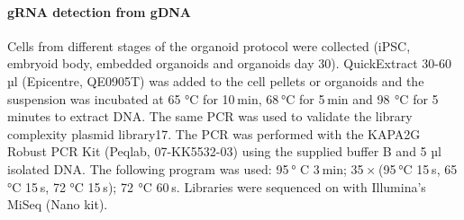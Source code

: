 \paragraph{gRNA detection from gDNA}
Cells from different stages of the organoid protocol were collected (iPSC, embryoid body, embedded organoids and organoids day 30). QuickExtract 30-60 µl (Epicentre, QE0905T) was added to the cell pellets or organoids and the suspension was incubated at 65 °C for 10 min, 68 °C for 5 min and 98  °C for 5 minutes to extract DNA. The same PCR was used to validate the library complexity plasmid library17. The PCR was performed with the KAPA2G Robust PCR Kit (Peqlab, 07-KK5532-03) using the supplied buffer B and  5 µl isolated DNA. The following program was used: 95 ° C 3 min; 35 × (95 °C 15 s, 65 °C 15 s, 72  °C 15 s); 72  °C 60 s. Libraries were sequenced on with Illumina’s MiSeq (Nano kit).
 
